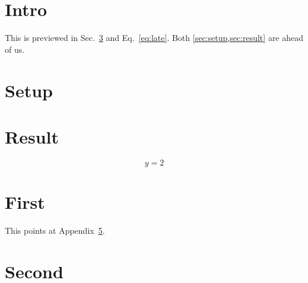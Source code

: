 \documentclass{article}
\begin{document}
\section{Intro}
This is previewed in Sec.~\ref{sec:result} and Eq.~\eqref{eq:late}.
Both \cref{sec:setup,sec:result} are ahead of us.
\section{Setup}\label{sec:setup}
\section{Result}\label{sec:result}
\begin{equation}\label{eq:late}
  y = 2
\end{equation}
\appendix
\section{First}\label{app:first}
This points at Appendix~\ref{app:second}.
\section{Second}\label{app:second}
\end{document}
